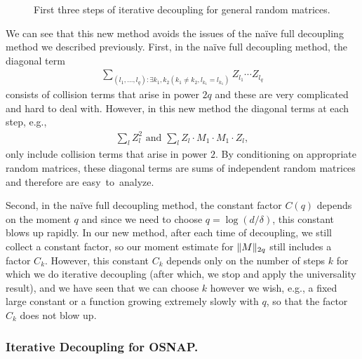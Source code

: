 \documentclass[11pt]{amsart}
\numberwithin{equation}{section}
\numberwithin{equation}{section}
\DeclarePairedDelimiter{\norm}{\lVert}{\rVert}
\begin{document}
\begin{figure}[t]
\caption{First three steps of iterative decoupling for general random matrices.}
\label{fig:itergen}
\end{figure}

We can see that this new method avoids the issues of the na\"ive full decoupling method we described previously. First, in the na\"ive full decoupling method, the diagonal term \begin{align*}
\sum \limits_{(l_1,...,l_{q}):\exists k_1,k_2( k_1 \ne k_2,l_{k_1} = l_{k_1})}Z_{l_1} \cdots Z_{l_{q}}
\end{align*} consists of collision terms that arise in power $2q$ and these are very complicated and hard to deal with. However, in this new method the diagonal terms at each step, e.g.,
\begin{align*}
    \sum_{l} Z_{l}^2 \text{\ \ \ \  and \ \ \ \ } \sum_{l} Z_l\cdot M_1 \cdot M_1 \cdot Z_l,
\end{align*}  only include collision terms that arise in power $2$. 
By conditioning on appropriate random matrices, these diagonal terms are sums of independent random matrices and therefore are easy~to~analyze. 

Second, in the na\" ive full decoupling method, the constant factor $C(q)$ depends on the moment $q$ and since we need to choose $q=\log(d/\delta)$, this constant blows up rapidly. In our new method, after each time of decoupling, we still collect a constant factor, so our moment estimate for $\norm{M}_{2q}$ still includes a factor $C_k$. However, this constant $C_k$ depends only on the number of steps $k$ for which we do iterative decoupling (after which, we stop and apply the universality result), and we have seen that we can choose $k$ however we wish, e.g., a fixed large constant or a function growing extremely slowly with $q$, so that the factor $C_k$ does not blow up.




\subsubsection{Iterative Decoupling for OSNAP.}
\label{subsubsec:overview-osnap}
\end{document}
